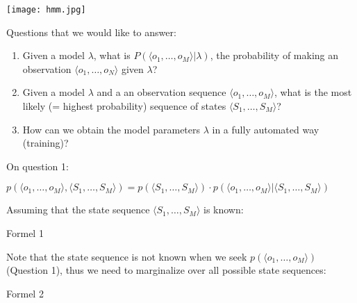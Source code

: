 \documentclass[a4paper]{article}
\begin{document}
\texttt{[image: hmm.jpg]}

\noindent Questions that we would like to answer:
\begin{enumerate}
    \item
        Given a model $\lambda$, what is \(P(\langle o_1, \dots, o_M \rangle | \lambda) \), the probability of making an observation $\langle o_1, \dots, o_N \rangle$ given $\lambda$?
    \item
        Given a model $\lambda$ and a an observation sequence \(\langle o_1, \dots, o_M \rangle \), what is the most likely (= highest probability) sequence of states \( \langle S_1, \dots, S_M \rangle \)?
    \item
        How can we obtain the model parameters $\lambda$ in a fully automated way (training)?
\end{enumerate}

\noindent On question 1: 

\( p(\langle o_1, \dots, o_M \rangle, \langle S_1, \dots, S_M \rangle) = p(\langle S_1, \dots, S_M \rangle) \cdot p(\langle o_1, \dots, o_M \rangle | \langle S_1, \dots, S_M \rangle) \)

Assuming that the state sequence \(\langle S_1, \dots, S_M \rangle\) is known:



Formel 1

Note that the state sequence is not known when we seek \(p(\langle o_1, \dots, o_M \rangle) \) (Question 1), thus we need to marginalize over all possible state sequences:

Formel 2
\end{document}
